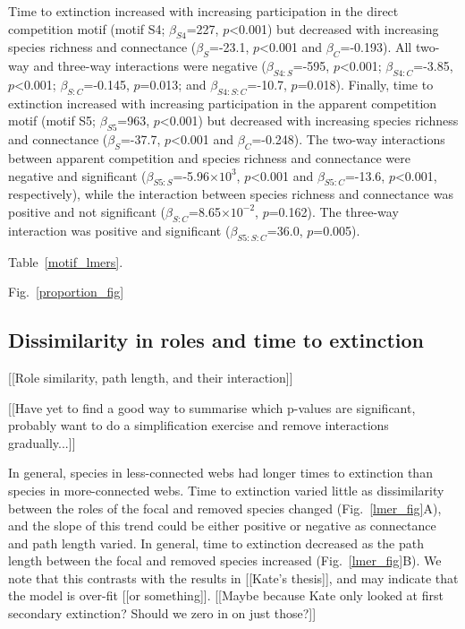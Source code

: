 \documentclass[12pt]{article}
\begin{document}
			Time to extinction increased with increasing participation in the direct competition motif (motif S4; $\beta_{S4}$=227, $p$\textless0.001) but decreased with increasing species richness and connectance ($\beta_{S}$=-23.1, $p$\textless0.001 and $\beta_{C}$=-0.193). All two-way and three-way interactions were negative ($\beta_{S4:S}$=-595, $p$\textless0.001; $\beta_{S4:C}$=-3.85, $p$\textless0.001; $\beta_{S:C}$=-0.145, $p$=0.013; and $\beta_{S4:S:C}$=-10.7, $p$=0.018). Finally, time to extinction increased with increasing participation in the apparent competition motif (motif S5; $\beta_{S5}$=963, $p$\textless0.001) but decreased with increasing species richness and connectance ($\beta_{S}$=-37.7, $p$\textless0.001 and $\beta_{C}$=-0.248). The two-way interactions between apparent competition and species richness and connectance were negative and significant ($\beta_{S5:S}$=-5.96$\times10^3$, $p$\textless0.001 and $\beta_{S5:C}$=-13.6, $p$\textless0.001, respectively), while the interaction between species richness and connectance was positive and not significant ($\beta_{S:C}$=8.65$\times10^{-2}$, $p$=0.162). The three-way interaction was positive and significant ($\beta_{S5:S:C}$=36.0, $p$=0.005). 


			Table~\ref{motif_lmers}. %


			Fig.~\ref{proportion_fig} %

	\subsection*{Dissimilarity in roles and time to extinction}

		[[Role similarity, path length, and their interaction]]

		[[Have yet to find a good way to summarise which p-values are significant, probably want to do a simplification exercise and remove interactions gradually...]]

		In general, species in less-connected webs had longer times to extinction than species in more-connected webs. Time to extinction varied little as dissimilarity between the roles of the focal and removed species changed (Fig.~\ref{lmer_fig}A), and the slope of this trend could be either positive or negative as connectance and path length varied. In general, time to extinction decreased as the path length between the focal and removed species increased (Fig.~\ref{lmer_fig}B). We note that this contrasts with the results in [[Kate's thesis]], and may indicate that the model is over-fit [[or something]].
		[[Maybe because Kate only looked at first secondary extinction? Should we zero in on just those?]]
\end{document}
